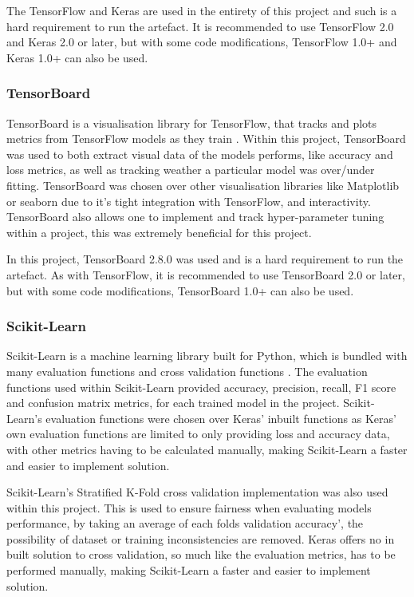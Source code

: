 The TensorFlow and Keras are used in the entirety of this project and such is a hard requirement to run the artefact. It is recommended to use TensorFlow 2.0 and Keras 2.0 or later, but with some code modifications, TensorFlow 1.0+ and Keras 1.0+ can also be used.

\subsubsection{TensorBoard}
TensorBoard is a visualisation library for TensorFlow, that tracks and plots metrics from TensorFlow models as they train \citep{TensorBo28:online}. Within this project, TensorBoard was used to both extract visual data of the models performs, like accuracy and loss metrics, as well as tracking weather a particular model was over/under fitting. TensorBoard was chosen over other visualisation libraries like Matplotlib or seaborn due to it's tight integration with TensorFlow, and interactivity. TensorBoard also allows one to implement and track hyper-parameter tuning within a project, this was extremely beneficial for this project.

In this project, TensorBoard 2.8.0 was used and is a hard requirement to run the artefact. As with TensorFlow, it is recommended to use TensorBoard 2.0 or later, but with some code modifications, TensorBoard 1.0+ can also be used.

\subsubsection{Scikit-Learn}
Scikit-Learn is a machine learning library built for Python, which is bundled with many evaluation functions \citep{33Metric9:online} and cross validation functions \citep{31Crossv34:online}. The evaluation functions used within Scikit-Learn provided accuracy, precision, recall, F1 score and confusion matrix metrics, for each trained model in the project. Scikit-Learn's evaluation functions were chosen over Keras' inbuilt functions as Keras' own evaluation functions are limited to only providing loss and accuracy data\citep{Modeltra48:online}, with other metrics having to be calculated manually, making Scikit-Learn a faster and easier to implement solution. 

Scikit-Learn's Stratified K-Fold cross validation implementation was also used within this project. This is used to ensure fairness when evaluating models performance, by taking an average of each folds validation accuracy', the possibility of dataset or training inconsistencies are removed. Keras offers no in built solution to cross validation, so much like the evaluation metrics, has to be performed manually, making Scikit-Learn a faster and easier to implement solution.


